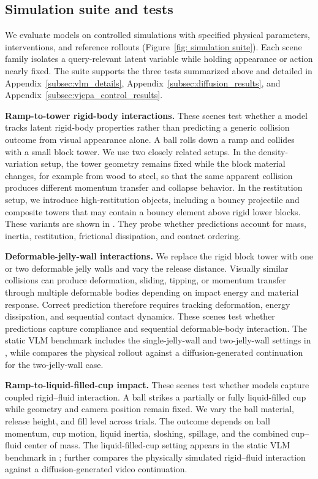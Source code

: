 \documentclass{article}
\begin{document}
\subsection{Simulation suite and tests}
\label{sec:simulation-suite}

We evaluate models on controlled simulations with specified physical parameters, interventions, and reference rollouts (Figure~\ref{fig: simulation suite}). Each scene family isolates a query-relevant latent variable while holding appearance or action nearly fixed. The suite supports the three tests summarized above and detailed in Appendix~\ref{subsec:vlm_details}, Appendix~\ref{subsec:diffusion_results}, and Appendix~\ref{subsec:vjepa_control_results}.

\textbf{Ramp-to-tower rigid-body interactions.}
These scenes test whether a model tracks latent rigid-body properties rather than predicting a generic collision outcome from visual appearance alone. A ball rolls down a ramp and collides with a small block tower. We use two closely related setups. In the density-variation setup, the tower geometry remains fixed while the block material changes, for example from wood to steel, so that the same apparent collision produces different momentum transfer and collapse behavior. In the restitution setup, we introduce high-restitution objects, including a bouncy projectile and composite towers that may contain a bouncy element above rigid lower blocks. These variants are shown in . They probe whether predictions account for mass, inertia, restitution, frictional dissipation, and contact ordering.

\textbf{Deformable-jelly-wall interactions.}
We replace the rigid block tower with one or two deformable jelly walls and vary the release distance. Visually similar collisions can produce deformation, sliding, tipping, or momentum transfer through multiple deformable bodies depending on impact energy and material response. Correct prediction therefore requires tracking deformation, energy dissipation, and sequential contact dynamics. These scenes test whether predictions capture compliance and sequential deformable-body interaction. The static VLM benchmark includes the single-jelly-wall and two-jelly-wall settings in , while  compares the physical rollout against a diffusion-generated continuation for the two-jelly-wall case.

\textbf{Ramp-to-liquid-filled-cup impact.}
These scenes test whether models capture coupled rigid--fluid interaction. A ball strikes a partially or fully liquid-filled cup while geometry and camera position remain fixed. We vary the ball material, release height, and fill level across trials. The outcome depends on ball momentum, cup motion, liquid inertia, sloshing, spillage, and the combined cup--fluid center of mass. The liquid-filled-cup setting appears in the static VLM benchmark in ;  further compares the physically simulated rigid--fluid interaction against a diffusion-generated video continuation.
\end{document}
